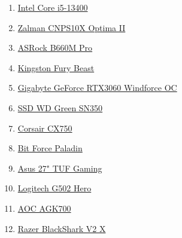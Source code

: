 \documentclass[14pt]{article}
\begin{document}
\begin{enumerate}
  \item \href{https://www.instar-informatika.hr/procesor-intel-core-i5-13400/150919/product/}{Intel Core i5-13400}
  \item \href{https://www.instar-informatika.hr/hladnjak-za-procesor-zalman-cnps10x-optima-ii-1x120mm-intel-lga1151-/147663/product/}{Zalman CNPS10X Optima II}
  \item \href{https://www.instar-informatika.hr/maticna-ploca-asrock-b660m-pro-rs-ddr4-intel-lga1700-micro-atx/113005/product/}{ASRock B660M Pro}
  \item \href{https://www.instar-informatika.hr/memorija-kingston-fury-beast-black-xmp-32gb-2x16gb-ddr4-3200mhz-c/220718/product/}{Kingston Fury Beast}
  \item \href{https://www.instar-informatika.hr/graficka-gigabyte-geforce-rtx3060-windforce-oc-12gb-gddr6/224178/product/#tehspecsection}{Gigabyte GeForce RTX3060 Windforce OC}
  \item \href{https://www.instar-informatika.hr/ssd-western-digital-green-sn350-1tb-m2-nvme-pcie-gen3-r3200w2500/108273/product/}{SSD WD Green SN350}
  \item \href{https://www.instar-informatika.hr/napajanje-corsair-cx750-750w-80-bronze-atx/220363/product/}{Corsair CX750}
  \item \href{https://www.instar-informatika.hr/kuciste-bit-force-paladin-argb-4-mid-tower-kaljeno-staklo-bez-napaj/220338/product/}{Bit Force Paladin}
  \item \href{https://www.instar-informatika.hr/monitor-asus-27-tuf-gaming-vg279q1a-ips-gaming-adaptive-sync-amd-/117476/product/}{Asus 27" TUF Gaming}
  \item \href{https://www.instar-informatika.hr/mis-logitech-g502-hero-zicani-gaming-25600dpi-hero-senzor-rgb-cr/77229/product/}{Logitech G502 Hero}
  \item \href{https://www.instar-informatika.hr/tipkovnica-aoc-agk700-zicana-gaming-mehanicka-cherry-mx-red-switch/160870/product/#opis}{AOC AGK700}
  \item \href{https://www.instar-informatika.hr/slusalice-razer-blackshark-v2-x-zicane-gaming-71-mikrofon-over-e/96560/product/}{Razer BlackShark V2 X}
\end{enumerate}
\end{document}

